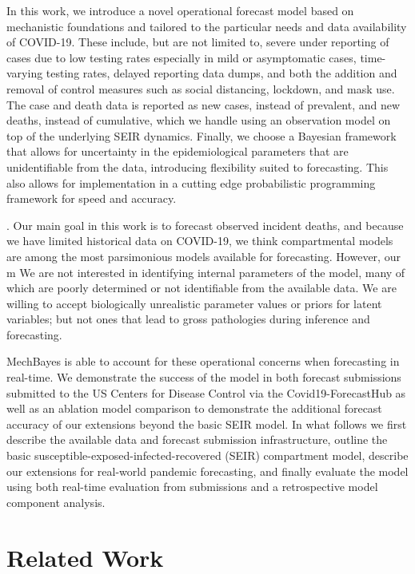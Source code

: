 \documentclass[11pt]{amsart}
\begin{document}
In this work, we introduce a novel operational forecast model based on mechanistic foundations and tailored to the particular needs and data availability of COVID-19. These include, but are not limited to, severe under reporting of cases due to low testing rates especially in mild or asymptomatic cases, time-varying testing rates, delayed reporting data dumps, and both the addition and removal of control measures such as social distancing, lockdown, and mask use. The case and death data is reported as new cases, instead of prevalent, and new deaths, instead of cumulative, which we handle using an observation model on top of the underlying SEIR dynamics. Finally, we choose a Bayesian framework that allows for uncertainty in the epidemiological parameters that are unidentifiable from the data, introducing flexibility suited to forecasting. This also allows for implementation in a cutting edge probabilistic programming framework for speed and accuracy. 

. Our main goal in this work is to forecast observed incident deaths, and because we have limited historical data on COVID-19, we think compartmental models are among the most parsimonious models available for forecasting. However, our m We are not interested in identifying internal parameters of the model, many of which are poorly determined or not identifiable from the available data. We are willing to accept biologically unrealistic parameter values or priors for latent variables; but not ones that lead to gross pathologies during inference and forecasting.


 MechBayes is able to account for these operational concerns when forecasting in real-time. We demonstrate the success of the model in both forecast submissions submitted to the US Centers for Disease Control via the Covid19-ForecastHub as well as an ablation model comparison to demonstrate the additional forecast accuracy of our extensions beyond the basic SEIR model. In what follows we first describe the available data and forecast submission infrastructure, outline the basic susceptible-exposed-infected-recovered (SEIR) compartment model, describe our extensions for real-world pandemic forecasting, and finally evaluate the model using both real-time evaluation from submissions and a retrospective model component analysis. 



\section{Related Work}
\end{document}
